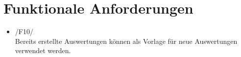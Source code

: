 \section{Funktionale Anforderungen}

\begin{itemize}
	\item /F10/\\Bereits erstellte Auswertungen können als Vorlage für neue Auswertungen verwendet werden.
\end{itemize}